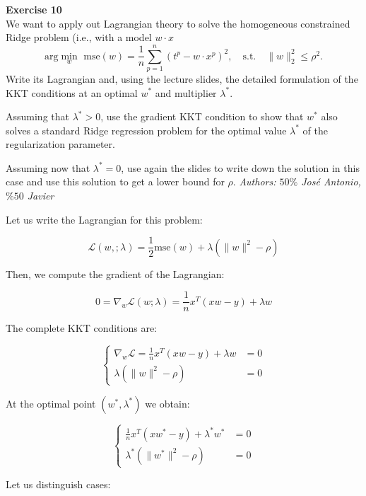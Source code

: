\documentclass[11pt,table]{article}
\newenvironment{problem}[2][Exercise]
{ \begin{mdframed}[backgroundcolor=gray!20] \textbf{#1 #2} \\}
	{\hspace{0.0cm}\newline\newline \emph{Authors: \(50\%\) José Antonio, \(\%50\) Javier}  \end{mdframed}}
\newcommand\norm[1]{\lVert#1\rVert}
\begin{document}
\begin{problem}{10}
We want to apply out Lagrangian theory to solve the homogeneous constrained Ridge problem (i.e., with a model \(w\cdot x\)
\[
	\text{arg}\min_{w} \text{ mse}(w) = \frac{1}{n} \sum_{p=1}^n (t^p - w \cdot x^p)^2, \quad \text{s.t.} \quad \norm{w}_2^2 \leq \rho^2.
\]
Write its Lagrangian and, using the lecture slides, the detailed formulation of the KKT conditions at an optimal \(w^*\) and multiplier \(\lambda^*\).

Assuming that \(\lambda^* > 0\), use the gradient KKT condition to show that \(w^*\) also solves a standard Ridge regression problem for the optimal value \(\lambda^*\) of the regularization parameter.

Assuming now that \(\lambda^* = 0\), use again the slides to write down the solution in this case and use this solution to get a lower bound for \(\rho\).
\end{problem}

Let us write the Lagrangian for this problem:

\[
	\mathcal L(w, ; \lambda) = \frac{1}{2} \text{mse}(w) + \lambda \left(\parallel w \parallel^2 - \rho\right)
\]

Then, we compute the gradient of the Lagrangian:

\[
	0 = \nabla_w \mathcal L(w; \lambda) = \frac{1}{n}x^T(xw - y) + \lambda w
\]

The complete KKT conditions are:

\begin{equation*}
	\begin{cases}
		\nabla_w \mathcal L = \frac{1}{n}x^T(xw - y) + \lambda w & = 0 \\
		\lambda \left(\parallel w \parallel^2 - \rho\right)      & = 0
	\end{cases}
\end{equation*}

At the optimal point $(w^*, \lambda^*)$ we obtain:

\begin{equation}
	\label{eq10}
	\begin{cases}
		\frac{1}{n}x^T(xw^* - y) + \lambda^* w^*                & = 0 \\
		\lambda^* \left(\parallel w^* \parallel^2 - \rho\right) & = 0
	\end{cases}
\end{equation}

Let us distinguish cases:
\end{document}

